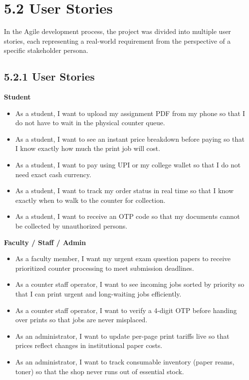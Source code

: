 \documentclass[12pt,a4paper]{report}
\begin{document}
\section{5.2 User Stories}
In the Agile development process, the project was divided into multiple user stories, each representing a real-world requirement from the perspective of a specific stakeholder persona.

\subsection{5.2.1 User Stories}
\noindent\textbf{Student}
\begin{itemize}[leftmargin=0.35in, itemsep=2pt]
  \item As a student, I want to upload my assignment PDF from my phone so that I do not have to wait in the physical counter queue.
  \item As a student, I want to see an instant price breakdown before paying so that I know exactly how much the print job will cost.
  \item As a student, I want to pay using UPI or my college wallet so that I do not need exact cash currency.
  \item As a student, I want to track my order status in real time so that I know exactly when to walk to the counter for collection.
  \item As a student, I want to receive an OTP code so that my documents cannot be collected by unauthorized persons.
\end{itemize}

\noindent\textbf{Faculty / Staff / Admin}
\begin{itemize}[leftmargin=0.35in, itemsep=2pt]
  \item As a faculty member, I want my urgent exam question papers to receive prioritized counter processing to meet submission deadlines.
  \item As a counter staff operator, I want to see incoming jobs sorted by priority so that I can print urgent and long-waiting jobs efficiently.
  \item As a counter staff operator, I want to verify a 4-digit OTP before handing over prints so that jobs are never misplaced.
  \item As an administrator, I want to update per-page print tariffs live so that prices reflect changes in institutional paper costs.
  \item As an administrator, I want to track consumable inventory (paper reams, toner) so that the shop never runs out of essential stock.
\end{itemize}
\end{document}
